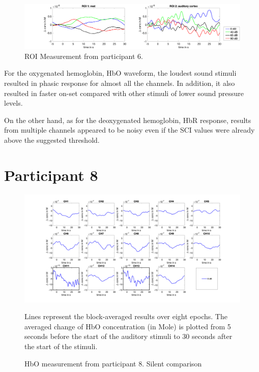 \begin{figure}[H]
  \centering
    \includegraphics[scale=.29]{bilder/ROI/sub_shelia_s_HbO.png}
  \caption{ROI Measurement from participant  6.}
\end{figure}

For the oxygenated hemoglobin, \acrshort{HbO} waveform, the loudest sound stimuli resulted in phasic response for almost all the channels. In addition, it also resulted in faster on-set compared with other stimuli of lower sound pressure levels.

On the other hand, as for the deoxygenated hemoglobin, \acrshort{HbR} response, results from multiple channels appeared to be noisy even if the SCI values were already above the suggested threshold.

\newpage

\section {Participant 8}

\begin{figure}[H]
  \centering
    \includegraphics[scale=.4]{bilder/HbO_Mole/sub_luca2_s_HbO.png}
  \caption{HbO measurement from participant 8. Silent comparison}
  \label{fig:somesignal}
  \medskip
  \footnotesize {Lines represent the block-averaged results over eight epochs. The averaged change of HbO concentration (in Mole) is plotted from 5 seconds before the start of the auditory stimuli to 30 seconds after the start of the stimuli.}
\end{figure}

